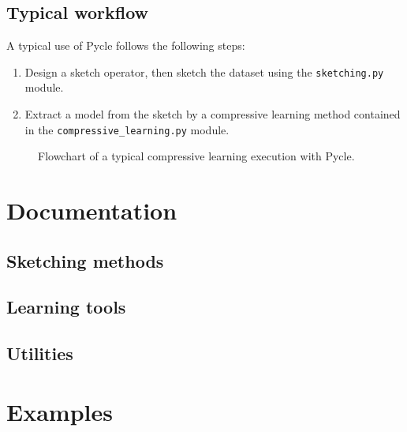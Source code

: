 \documentclass[]{article}
\newcommand{\code}{\texttt}
\renewcommand{\Vec}[1]{\bm{#1}} %
\begin{document}
\subsection{Typical workflow}

A typical use of Pycle follows the following steps:
\begin{enumerate}
	\item Design a sketch operator, then sketch the dataset using the \code{sketching.py} module.
	\item Extract a model from the sketch by a compressive learning method contained in the \code{compressive\_learning.py} module.
\end{enumerate}




	
		
\begin{figure}[!htb]
	\centering
	\caption{Flowchart of a typical compressive learning execution with Pycle.}
	\label{fig:flowchart}
\end {figure}
		




\section{Documentation}
\subsection{Sketching methods} 

\subsection{Learning tools} 

\subsection{Utilities} 

\section{Examples}


\newpage


\end{document}
